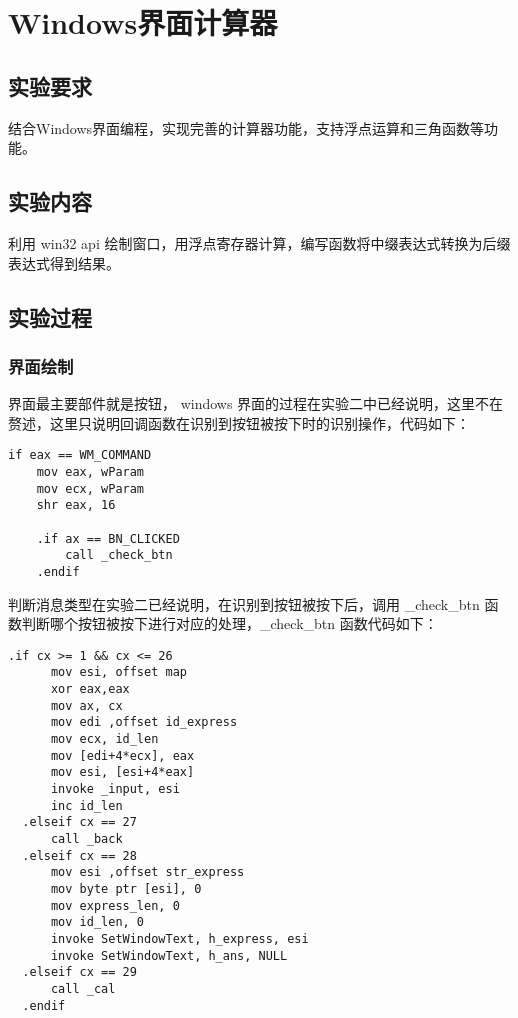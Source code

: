 \documentclass[proposal-report]{bitart}
\begin{document}
\section{Windows界面计算器}

\subsection{实验要求}

结合Windows界面编程，实现完善的计算器功能，支持浮点运算和三角函数等功能。

\subsection{实验内容}

利用 win32 api 绘制窗口，用浮点寄存器计算，编写函数将中缀表达式转换为后缀表达式得到结果。

\subsection{实验过程}

\subsubsection{界面绘制}

界面最主要部件就是按钮， windows 界面的过程在实验二中已经说明，这里不在赘述，这里只说明回调函数在识别到按钮被按下时的识别操作，代码如下：

\begin{lstlisting}[language={[x86masm]Assembler}]
  if eax == WM_COMMAND
    mov eax, wParam
    mov ecx, wParam
    shr eax, 16

    .if ax == BN_CLICKED
        call _check_btn
    .endif
\end{lstlisting}

判断消息类型在实验二已经说明，在识别到按钮被按下后，调用 \_check\_btn 函数判断哪个按钮被按下进行对应的处理，\_check\_btn 函数代码如下：

\begin{lstlisting}[language={[x86masm]Assembler}]
  .if cx >= 1 && cx <= 26
      mov esi, offset map
      xor eax,eax
      mov ax, cx
      mov edi ,offset id_express
      mov ecx, id_len
      mov [edi+4*ecx], eax
      mov esi, [esi+4*eax]
      invoke _input, esi
      inc id_len
  .elseif cx == 27
      call _back
  .elseif cx == 28
      mov esi ,offset str_express
      mov byte ptr [esi], 0
      mov express_len, 0
      mov id_len, 0
      invoke SetWindowText, h_express, esi
      invoke SetWindowText, h_ans, NULL
  .elseif cx == 29
      call _cal
  .endif
\end{lstlisting}
\end{document}
